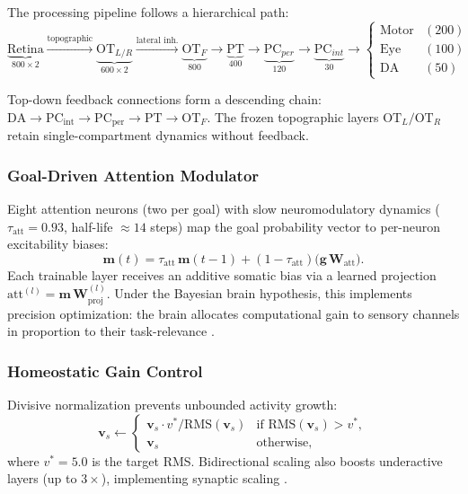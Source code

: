 \documentclass[12pt]{article}
\begin{document}
The processing pipeline follows a hierarchical path:
\begin{equation}\label{eq:pipeline}
  \underbrace{\text{Retina}}_{800 \times 2}
  \xrightarrow{\text{topographic}}
  \underbrace{\text{OT}_{L/R}}_{600 \times 2}
  \xrightarrow{\text{lateral inh.}}
  \underbrace{\text{OT}_F}_{800}
  \xrightarrow{}
  \underbrace{\text{PT}}_{400}
  \rightarrow
  \underbrace{\text{PC}_{per}}_{120}
  \xrightarrow{}
  \underbrace{\text{PC}_{int}}_{30}
  \rightarrow
  \begin{cases}
    \text{Motor} & (200) \\
    \text{Eye}   & (100) \\
    \text{DA}    & (50)
  \end{cases}
\end{equation}

Top-down feedback connections form a descending chain:
$\text{DA} \to \text{PC}_\text{int} \to \text{PC}_\text{per}
\to \text{PT} \to \text{OT}_F$.
The frozen topographic layers $\text{OT}_L / \text{OT}_R$ retain
single-compartment dynamics without feedback.

\subsubsection{Goal-Driven Attention Modulator}

Eight attention neurons (two per goal) with slow neuromodulatory
dynamics ($\tau_\text{att} = 0.93$, half-life $\approx 14$ steps)
map the goal probability vector to per-neuron excitability biases:
\begin{equation}\label{eq:attention}
  \mathbf{m}(t) = \tau_\text{att}\,\mathbf{m}(t{-}1)
    + (1 - \tau_\text{att})\bigl(\mathbf{g}\,\mathbf{W}_\text{att}\bigr).
\end{equation}
Each trainable layer receives an additive somatic bias via a learned
projection $\text{att}^{(l)} = \mathbf{m}\,\mathbf{W}_\text{proj}^{(l)}$.
Under the Bayesian brain hypothesis, this implements precision
optimization: the brain allocates computational gain to sensory
channels in proportion to their task-relevance
\citep{feldman2010}.

\subsubsection{Homeostatic Gain Control}

Divisive normalization prevents unbounded activity growth:
\begin{equation}\label{eq:gain_control}
  \mathbf{v}_s \leftarrow
  \begin{cases}
    \mathbf{v}_s \cdot v^*/\text{RMS}(\mathbf{v}_s)
      & \text{if } \text{RMS}(\mathbf{v}_s) > v^*, \\
    \mathbf{v}_s & \text{otherwise},
  \end{cases}
\end{equation}
where $v^* = 5.0$ is the target RMS.
Bidirectional scaling also boosts underactive layers (up to $3\times$),
implementing synaptic scaling \citep{turrigiano2004,turrigiano2008}.
\end{document}
